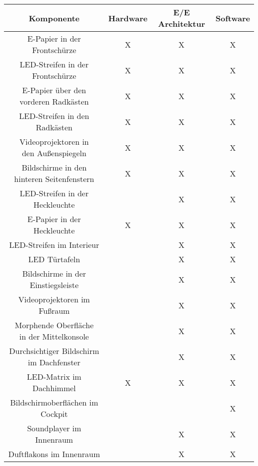 \begin{table}[hbt]	
	\centering
	\renewcommand{\arraystretch}{1.5}	%
	\label{tab:Entwicklung}
	\begin{tabular}{c|ccc}
		\textbf{Komponente} & \textbf{Hardware} & \textbf{E/E Architektur} & \textbf{Software} \\ 
		\hline 
		\hline 
		\parbox[t]{0.4\linewidth}{\centering E-Papier in der Frontschürze} & X & X & X \\
		\parbox[t]{0.4\linewidth}{\centering LED-Streifen in der Frontschürze} & X & X & X \\
		\parbox[t]{0.4\linewidth}{\centering E-Papier über den vorderen Radkästen} & X & X & X \\
		\parbox[t]{0.4\linewidth}{\centering LED-Streifen in den Radkästen} & X & X & X \\
		\parbox[t]{0.4\linewidth}{\centering Videoprojektoren in\\den Außenspiegeln} & X & X & X \\
		\parbox[t]{0.4\linewidth}{\centering Bildschirme in den\\hinteren Seitenfenstern} & X & X & X \\
		\parbox[t]{0.4\linewidth}{\centering LED-Streifen in der Heckleuchte} &  & X & X \\
		\parbox[t]{0.4\linewidth}{\centering E-Papier in der Heckleuchte} & X & X & X \\
		\parbox[t]{0.4\linewidth}{\centering LED-Streifen im Interieur} &  & X & X \\
		\parbox[t]{0.4\linewidth}{\centering LED Türtafeln} &  & X & X \\
		\parbox[t]{0.4\linewidth}{\centering Bildschirme in der Einstiegsleiste} &  & X & X \\
		\parbox[t]{0.4\linewidth}{\centering Videoprojektoren im Fußraum} &  & X & X \\
		\parbox[t]{0.4\linewidth}{\centering Morphende Oberfläche\\in der Mittelkonsole} &  & X & X \\
		\parbox[t]{0.4\linewidth}{\centering Durchsichtiger Bildschirm\\im Dachfenster} &  & X & X \\
		LED-Matrix im Dachhimmel & X & X & X \\
		\parbox[t]{0.4\linewidth}{\centering Bildschirmoberflächen im Cockpit} &  &  & X \\
		\parbox[t]{0.4\linewidth}{\centering Soundplayer im Innenraum} &  & X & X \\
		\parbox[t]{0.4\linewidth}{\centering Duftflakons im Innenraum} &  & X & X \\
	\end{tabular} 
\end{table}


